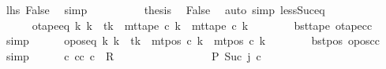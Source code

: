 \begin{isabellebody}
\ lhs\ False\ \isamarkupfalse%
\ simp\isanewline
\ \ \ \ \ \ \ \ \isamarkupfalse%
\ {\isacharquery}{\kern0pt}thesis\ \isamarkupfalse%
\ False\ \isamarkupfalse%
\ {\isacharparenleft}{\kern0pt}auto\ simp{\isacharcolon}{\kern0pt}\ less{\isacharunderscore}{\kern0pt}Suc{\isacharunderscore}{\kern0pt}eq{\isacharparenright}{\kern0pt}\isanewline
\ \ \ \ \ \ \isamarkupfalse%
\isanewline
\ \ \ \ \isamarkupfalse%
\isanewline
\ \ \ \ \isamarkupfalse%
\ otape{\isacharunderscore}{\kern0pt}eq{\isacharcolon}{\kern0pt}\ {\isachardoublequoteopen}{\isasymforall}k{\isacharprime}{\kern0pt}{\isachardot}{\kern0pt}\ k{\isacharprime}{\kern0pt}\ {\isasymnoteq}\ tk\ {\isasymlongrightarrow}\ mt{\isacharunderscore}{\kern0pt}tape\ c{\isacharprime}{\kern0pt}{\isacharprime}{\kern0pt}\ k{\isacharprime}{\kern0pt}\ {\isacharequal}{\kern0pt}\ mt{\isacharunderscore}{\kern0pt}tape\ c{}\ k{\isacharprime}{\kern0pt}{\isachardoublequoteclose}\isanewline
\ \ \ \ \ \ \isamarkupfalse%
\ bst{\isacharunderscore}{\kern0pt}tape\ otape{\isacharunderscore}{\kern0pt}cc\ \isamarkupfalse%
\ simp\isanewline
\ \ \ \ \isamarkupfalse%
\ opos{\isacharunderscore}{\kern0pt}eq{\isacharcolon}{\kern0pt}\ {\isachardoublequoteopen}{\isasymforall}k{\isacharprime}{\kern0pt}{\isachardot}{\kern0pt}\ k{\isacharprime}{\kern0pt}\ {\isasymnoteq}\ tk\ {\isasymlongrightarrow}\ mt{\isacharunderscore}{\kern0pt}pos\ c{\isacharprime}{\kern0pt}{\isacharprime}{\kern0pt}\ k{\isacharprime}{\kern0pt}\ {\isacharequal}{\kern0pt}\ mt{\isacharunderscore}{\kern0pt}pos\ c{}\ k{\isacharprime}{\kern0pt}{\isachardoublequoteclose}\isanewline
\ \ \ \ \ \ \isamarkupfalse%
\ bst{\isacharunderscore}{\kern0pt}pos\ opos{\isacharunderscore}{\kern0pt}cc\ \isamarkupfalse%
\ simp\isanewline
\ \ \ \ \isamarkupfalse%
\ {\isachardoublequoteopen}{\isasymexists}c{\isacharprime}{\kern0pt}{\isacharprime}{\kern0pt}{\isachardot}{\kern0pt}\ {\isacharparenleft}{\kern0pt}cc{\isacharcomma}{\kern0pt}\ c{\isacharprime}{\kern0pt}{\isacharprime}{\kern0pt}{\isacharparenright}{\kern0pt}\ {\isasymin}\ R{\isacharprime}{\kern0pt}\isanewline
\ \ \ \ \ \ \ \ \ \ \ \ \ \ \ \ {\isasymand}\ {\isacharquery}{\kern0pt}P\ {\isacharparenleft}{\kern0pt}Suc\ j{\isacharparenright}{\kern0pt}\ c{\isacharprime}{\kern0pt}{\isacharprime}{\kern0pt}{\isachardoublequoteclose}\isanewline
\ \ \ \ \ \ \isamarkupfalse%

\end{isabellebody}
